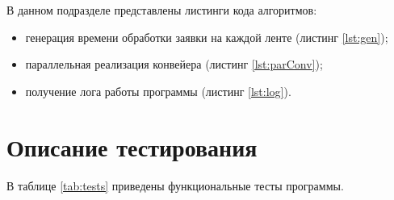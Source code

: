В данном подразделе представлены листинги кода алгоритмов:
\begin{itemize}[]
    \item генерация времени обработки заявки на каждой ленте (листинг
        \ref{lst:gen});
    \item параллельная реализация конвейера (листинг \ref{lst:parConv});
    \item получение лога работы программы (листинг \ref{lst:log}).
\end{itemize}


\begin{mdlisting}
    \captionsetup{justification=raggedright,singlelinecheck=off}
    
\end{mdlisting}

\begin{mdlisting}
    \captionsetup{justification=raggedright,singlelinecheck=off}
    
\end{mdlisting}

\section{Описание тестирования}

В таблице \ref{tab:tests} приведены функциональные тесты программы.

